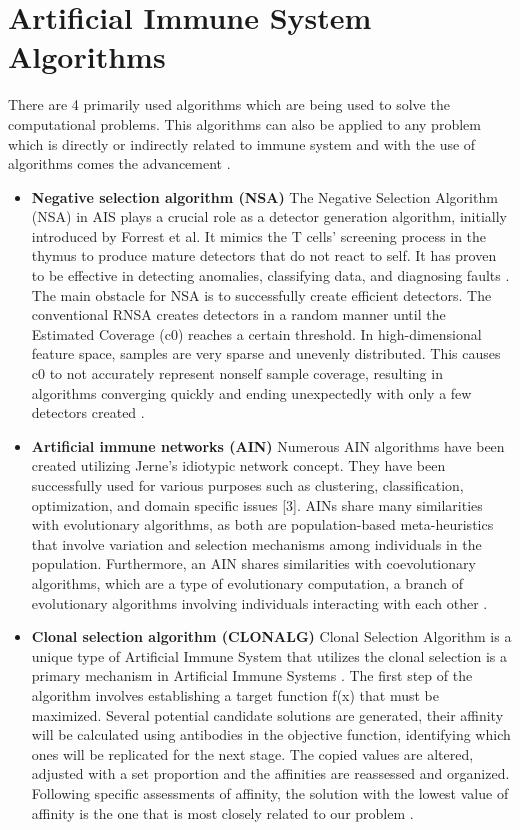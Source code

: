 \documentclass{article}
\begin{document}
\section{Artificial Immune System Algorithms}
There are 4 primarily used algorithms which are being used to solve the computational problems. This algorithms can also be applied to any problem which is directly or indirectly related to immune system and with the use of algorithms comes the advancement \cite{dasgupta2011recent}.
\begin{itemize}
    \item \textbf{Negative selection algorithm (NSA)}
The Negative Selection Algorithm (NSA) in AIS plays a crucial role as a detector generation algorithm, initially introduced by Forrest et al. It mimics the T cells' screening process in the thymus to produce mature detectors that do not react to self. It has proven to be effective in detecting anomalies, classifying data, and diagnosing faults \cite{YangChenLi+2017+121+134}. \\
The main obstacle for NSA is to successfully create efficient detectors. The conventional RNSA creates detectors in a random manner until the Estimated Coverage (c0) reaches a certain threshold. In high-dimensional feature space, samples are very sparse and unevenly distributed. This causes c0 to not accurately represent nonself sample coverage, resulting in algorithms converging quickly and ending unexpectedly with only a few detectors created \cite{YangChenLi+2017+121+134}. 
    \item \textbf{Artificial immune networks (AIN)}
Numerous AIN algorithms have been created utilizing Jerne's idiotypic network concept. They have been successfully used for various purposes such as clustering, classification, optimization, and domain specific issues [3]. AINs share many similarities with evolutionary algorithms, as both are population-based meta-heuristics that involve variation and selection mechanisms among individuals in the population. Furthermore, an AIN shares similarities with coevolutionary algorithms, which are a type of evolutionary computation, a branch of evolutionary algorithms involving individuals interacting with each other \cite{alonso2007solution}. 
    \item \textbf{Clonal selection algorithm (CLONALG)}
Clonal Selection Algorithm is a unique type of Artificial Immune System that utilizes the clonal selection is a primary mechanism in Artificial Immune Systems \cite{ulker2012comparison}.
The first step of the algorithm involves establishing a target function f(x) that must be maximized. Several potential candidate solutions are generated, their affinity will be calculated using antibodies in the objective function, identifying which ones will be replicated for the next stage. The copied values are altered, adjusted with a set proportion and the affinities are reassessed and organized. Following specific assessments of affinity, the solution with the lowest value of affinity is the one that is most closely related to our problem \cite{ulker2012comparison}. 

\end{itemize}
\end{document}
